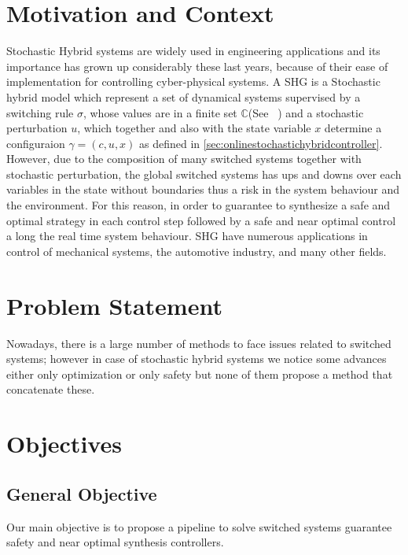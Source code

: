     \section{Motivation and Context}
    \label{sec:motivation}

    Stochastic Hybrid systems are widely used in engineering 
    applications and its importance has grown up considerably 
    these last years, because of their ease of implementation 
    for controlling cyber-physical systems. A \ac{SHG} is a Stochastic 
    hybrid model which represent a set of dynamical systems supervised by 
    a switching rule $\sigma$, whose values are in a finite set 
    $\mathbb{C}$(See ~\cite{liberzon2003switching}) and a stochastic
    perturbation $u$, which together and also with the state variable $x$
    determine a configuraion $\gamma = (c,u,x)$ as defined in 
    \autoref{sec:onlinestochastichybridcontroller}. However, due to 
    the composition of many switched systems together with stochastic 
    perturbation, the global switched systems has ups and downs
    over each variables in the state without boundaries thus a risk
    in the system behaviour and the environment. For this reason,
    in order to guarantee to synthesize a safe and optimal strategy
    in each control step followed by a safe and near optimal control
    a long the real time system behaviour. \ac{SHG} have numerous applications 
    in control of mechanical systems, the automotive industry, and 
    many other fields. 
    
    \section{Problem Statement}
    \label{sec:problem}
    Nowadays, there is a large number of methods to face issues related 
    to switched systems; however in case of stochastic hybrid systems 
     we notice some advances either only optimization or only safety
     but none of them propose a method that concatenate these. 
    
    \section{Objectives}
    \label{sec:objectives}

        \subsection*{General Objective}
        Our main objective is to propose a pipeline to solve switched systems guarantee safety and near optimal synthesis controllers. 

